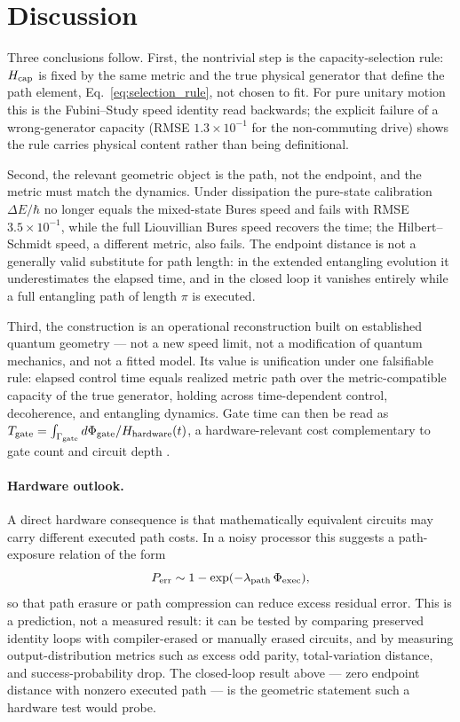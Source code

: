 \documentclass[12pt]{article}
\begin{document}
\section{Discussion}

Three conclusions follow. First, the nontrivial step is the capacity-selection rule: \(H_{\rm cap}\) is fixed by the same metric and the true physical generator that define the path element, Eq.~\eqref{eq:selection_rule}, not chosen to fit. For pure unitary motion this is the Fubini--Study speed identity read backwards; the explicit failure of a wrong-generator capacity (RMSE \(1.3\times10^{-1}\) for the non-commuting drive) shows the rule carries physical content rather than being definitional.

Second, the relevant geometric object is the path, not the endpoint, and the metric must match the dynamics. Under dissipation the pure-state calibration \(\Delta E/\hbar\) no longer equals the mixed-state Bures speed and fails with RMSE \(3.5\times10^{-1}\), while the full Liouvillian Bures speed recovers the time; the Hilbert--Schmidt speed, a different metric, also fails. The endpoint distance is not a generally valid substitute for path length: in the extended entangling evolution it underestimates the elapsed time, and in the closed loop it vanishes entirely while a full entangling path of length \(\pi\) is executed.

Third, the construction is an operational reconstruction built on established quantum geometry --- not a new speed limit, not a modification of quantum mechanics, and not a fitted model. Its value is unification under one falsifiable rule: elapsed control time equals realized metric path over the metric-compatible capacity of the true generator, holding across time-dependent control, decoherence, and entangling dynamics. Gate time can then be read as \(T_{\rm gate}=\int_{\Gamma_{\rm gate}} d\Phi_{\rm gate}/H_{\rm hardware}(t)\), a hardware-relevant cost complementary to gate count and circuit depth \cite{Nielsen2006,DelCampo2013}.

\paragraph{Hardware outlook.}
A direct hardware consequence is that mathematically equivalent circuits may carry different executed path costs. In a noisy processor this suggests a path-exposure relation of the form
\[
P_{\rm err}\sim 1-\exp(-\lambda_{\rm path}\,\Phi_{\rm exec}),
\]
so that path erasure or path compression can reduce excess residual error. This is a prediction, not a measured result: it can be tested by comparing preserved identity loops with compiler-erased or manually erased circuits, and by measuring output-distribution metrics such as excess odd parity, total-variation distance, and success-probability drop. The closed-loop result above ---  zero endpoint distance with nonzero executed path --- is the geometric statement such a hardware test would probe.
\end{document}
